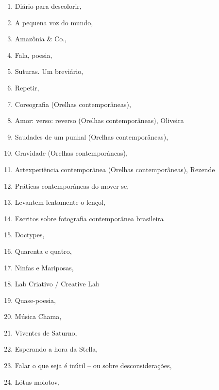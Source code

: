 \begin{multicols}{2}
\begin{enumerate}
\item Diário para descolorir, {}
\item A pequena voz do mundo, {}
\item Amazônia \& Co., {}
\item Fala, poesia, {}
\item Suturas. Um breviário, {}
\item Repetir, {}
\item Coreografia (Orelhas contemporâneas), {}
\item Amor: verso: reverso (Orelhas contemporâneas), {}Oliveira
\item Saudades de um punhal (Orelhas contemporâneas), {}
\item Gravidade (Orelhas contemporâneas), {}
\item Artexperiência contemporânea (Orelhas contemporâneas), {}Rezende
\item Práticas contemporâneas do mover-se, {}
\item Levantem lentamente o lençol, {}
\item Escritos sobre fotografia contemporânea brasileira
\item Doctypes, {}
\item Quarenta e quatro, {}
\item Ninfas e Mariposas, {}
\item Lab Criativo / Creative Lab
\item Quase-poesia, {}
\item Música Chama, {}
\item Viventes de Saturno, {}
\item Esperando a hora da Stella, {}
\item Falar o que seja é inútil – ou sobre desconsiderações, {}
\item Lótus molotov, {}

\end{enumerate}
\end{multicols}
